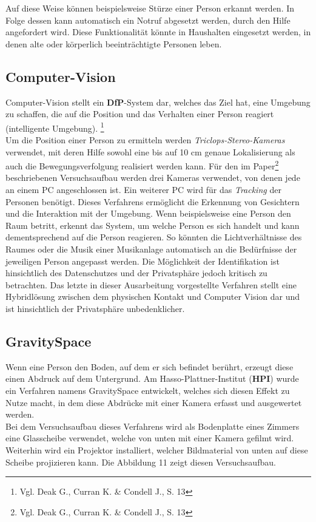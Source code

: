 Auf diese Weise können beispielsweise Stürze einer Person erkannt werden. In Folge dessen kann automatisch ein Notruf abgesetzt werden, durch den Hilfe angefordert wird. Diese Funktionalität könnte in Haushalten eingesetzt werden, in denen alte oder körperlich beeinträchtigte Personen leben.

\subsection{Computer-Vision}
Computer-Vision stellt ein \textbf{DfP}-System dar, welches das Ziel hat, eine Umgebung zu schaffen, die auf die Position und das Verhalten einer Person reagiert (intelligente Umgebung). \footnote{Vgl. Deak G., Curran K. \& Condell J., S. 13}\\
Um die Position einer Person zu ermitteln werden \textit{Triclops-Stereo-Kameras} verwendet, mit deren Hilfe sowohl eine bis auf 10 cm genaue Lokalisierung als auch die Bewegungsverfolgung realisiert werden kann. Für den im Paper\footnote{Vgl. Deak G., Curran K. \& Condell J., S. 13} beschriebenen Versuchsaufbau werden drei Kameras verwendet, von denen jede an einem PC angeschlossen ist. Ein weiterer PC wird für das \textit{Tracking} der Personen benötigt.\newline\newline
Dieses Verfahrens ermöglicht die Erkennung von Gesichtern und die Interaktion mit der Umgebung. Wenn beispielsweise eine Person den Raum betritt, erkennt das System, um welche Person es sich handelt und kann dementsprechend auf die Person reagieren. So könnten die Lichtverhältnisse des Raumes oder die Musik einer Musikanlage automatisch an die Bedürfnisse der jeweiligen Person angepasst werden. Die Möglichkeit der Identifikation ist hinsichtlich des Datenschutzes und der Privatsphäre jedoch kritisch zu betrachten.\newline\newline
Das letzte in dieser Ausarbeitung vorgestellte Verfahren stellt eine Hybridlösung zwischen dem physischen Kontakt und Computer Vision dar und ist hinsichtlich der Privatsphäre unbedenklicher.

\subsection{GravitySpace}
Wenn eine Person den Boden, auf dem er sich befindet berührt, erzeugt diese einen Abdruck auf dem Untergrund. Am Hasso-Plattner-Institut (\textbf{HPI}) wurde ein Verfahren namens GravitySpace entwickelt, welches sich diesen Effekt zu Nutze macht, in dem diese Abdrücke mit einer Kamera erfasst und ausgewertet werden.\\
Bei dem Versuchsaufbau dieses Verfahrens wird als Bodenplatte eines Zimmers eine Glasscheibe verwendet, welche von unten mit einer Kamera gefilmt wird. Weiterhin wird ein Projektor installiert, welcher Bildmaterial von unten auf diese Scheibe projizieren kann. Die Abbildung 11 zeigt diesen Versuchsaufbau.

